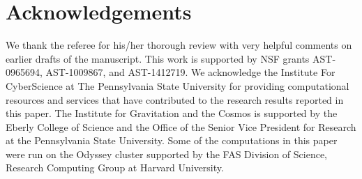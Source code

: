\documentclass[a4paper,fleqn,usenatbib,useAMS, twocolumn]{mnras}
\begin{document}
\section*{Acknowledgements}
We thank the referee for his/her thorough review 
with very helpful comments on earlier drafts of the manuscript.
This work is supported by NSF grants AST-0965694, AST-1009867,
and AST-1412719. We acknowledge the Institute For CyberScience at The Pennsylvania 
State University for providing computational resources and services that have contributed 
to the research results reported in this paper. The Institute for Gravitation and the Cosmos
is supported by the Eberly College of Science and the Office of the Senior Vice President for 
Research at the Pennsylvania State University. Some of the computations in this paper were 
run on the Odyssey cluster supported by the FAS Division of Science, Research Computing 
Group at Harvard University.

%
% 
\end{document}

